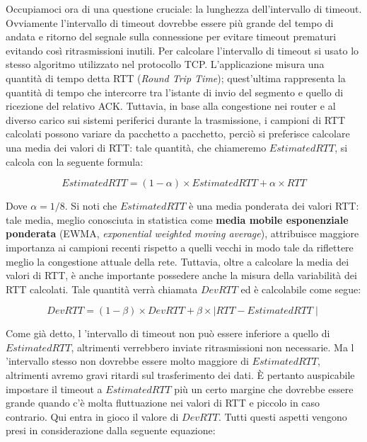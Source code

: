 \documentclass[10pt,a4paper, titlepage]{report}
\begin{document}
Occupiamoci ora di una questione cruciale: la lunghezza dell'intervallo di timeout. Ovviamente l'intervallo di timeout dovrebbe essere più grande del tempo di andata e ritorno del segnale sulla connessione per evitare timeout prematuri evitando così ritrasmissioni inutili. 
Per calcolare l'intervallo di timeout si usato lo stesso algoritmo utilizzato nel protocollo TCP. L'applicazione misura una quantità di tempo detta RTT (\textit{Round Trip Time}); quest'ultima rappresenta la quantità di tempo che intercorre tra l'istante di invio del segmento e quello di ricezione del relativo ACK. Tuttavia, in base alla congestione nei router e al diverso carico sui sistemi periferici durante la trasmissione, i campioni di RTT calcolati possono variare da pacchetto a pacchetto, perciò si preferisce calcolare una media dei valori di RTT: tale quantità, che chiameremo $EstimatedRTT$, si calcola con la seguente formula:

\begin{equation}
EstimatedRTT = (1 - \alpha) \times EstimatedRTT + \alpha \times RTT
\end{equation}

Dove $\alpha = 1/8$. Si noti che $EstimatedRTT$ è una media ponderata dei valori RTT: tale media, meglio conosciuta in statistica come \textbf{media mobile esponenziale ponderata} (EWMA, \textit{expo­nential weighted moving average}), attribuisce maggiore importanza ai campioni recenti rispetto a quelli vecchi in modo tale da riflettere meglio la congestione attuale della rete. Tuttavia, oltre a calcolare la media dei valori di RTT, è anche importante possedere anche la misura della variabilità dei RTT calcolati. Tale quantità verrà chiamata $DevRTT$ ed è calcolabile come segue:

\begin{equation}
DevRTT = (1 - \beta) \times DevRTT + \beta \times \mid RTT - EstimatedRTT \mid
\end{equation}

Come già detto, l 'intervallo di timeout non può essere inferiore a quello di $EstimatedRTT$, altrimenti verrebbero inviate ritrasmissioni non necessarie. Ma l 'intervallo stesso non dovrebbe essere molto maggiore di $EstimatedRTT$, altrimenti avremo gravi ritardi sul trasferimento dei dati. È pertanto auspicabile impostare il timeout a $EstimatedRTT$ più un certo margine che dovrebbe essere grande quando c'è molta fluttuazione nei valori di RTT e piccolo in caso contrario. Qui entra in gioco il valore di $DevRTT$. Tutti questi aspetti vengono presi in considerazione dalla seguente equazione:
\end{document}
